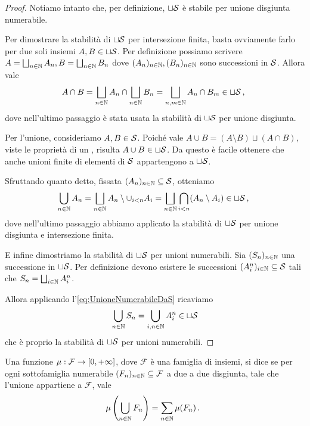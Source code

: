 \begin{proof}
	Notiamo intanto che, per definizione, $\sqcup\S$ è stabile per unione disgiunta numerabile.
	
	Per dimostrare la stabilità di $\sqcup\S$ per intersezione finita, basta ovviamente farlo per due soli insiemi $A,B\in\sqcup\S$. 
	Per definizione possiamo scrivere $A=\bigsqcup_{n\in\N} A_n, B=\bigsqcup_{n\in\N} B_n$ dove $(A_n)_{n\in\N},(B_n)_{n\in\N}$ sono successioni in $\S$. 
	Allora vale
	\begin{equation*}
		A\cap B=\bigsqcup_{n\in\N} A_n\cap\bigsqcup_{n\in\N} B_n=
		\bigsqcup_{n,m\in\N} A_n\cap B_m\in\sqcup\S \virgola
	\end{equation*}
	dove nell'ultimo passaggio è stata usata la stabilità di $\sqcup\S$ per unione disgiunta.
	
	Per l'unione, consideriamo $A,B\in\S$. Poiché vale $A\cup B=(A\setminus B)\sqcup(A\cap B)$, viste le proprietà di un \semiring{}, risulta $A\cup B\in \sqcup\S$. Da questo è facile ottenere che anche unioni finite di elementi di $\S$ appartengono a $\sqcup\S$.
	
	Sfruttando quanto detto, fissata $(A_n)_{n\in\N}\subseteq\S$, otteniamo
	\begin{equation}\label{eq:UnioneNumerabileDaS}
		\bigcup_{n\in\N} A_n=\bigsqcup_{n\in\N} A_n\setminus\cup_{i<n} A_i
		=\bigsqcup_{n\in\N} \bigcap_{i<n} (A_n\setminus A_i)\in\sqcup\S \virgola
	\end{equation}
	dove nell'ultimo passaggio abbiamo applicato la stabilità di $\sqcup\S$ per unione disgiunta e intersezione finita.
	
	E infine dimostriamo la stabilità di $\sqcup\S$ per unioni numerabili. Sia $(S_n)_{n\in\N}$ una successione in $\sqcup\S$. Per definizione devono esistere le successioni $(A^n_i)_{i\in\N}\subseteq \S$ tali che $S_n=\bigsqcup_{i\in\N} A^n_i$.
	
	Allora applicando l'\cref{eq:UnioneNumerabileDaS} ricaviamo
	\begin{equation*}
		\bigcup_{n\in\N}S_n=\bigcup_{i,n\in\N}A^n_i\in\sqcup\S 
	\end{equation*}
	che è proprio la stabilità di $\sqcup\S$ per unioni numerabili.
\end{proof}

\begin{definition}[{\sigadd[ità]}]
	Una funzione $\mu:\mathcal F\to \Rpiu$, dove $\mathcal F$ è una famiglia di insiemi, si dice \sigadd{} se per ogni sottofamiglia numerabile $(F_n)_{n\in\N}\subseteq \mathcal F$ a due a due disgiunta, tale che l'unione appartiene a $\mathcal F$, vale
	\begin{equation*}
		\mu\left(\bigcup_{n\in\N}F_n \right)=\sum_{n\in\N} \mu(F_n) \punto
	\end{equation*}
\end{definition}

